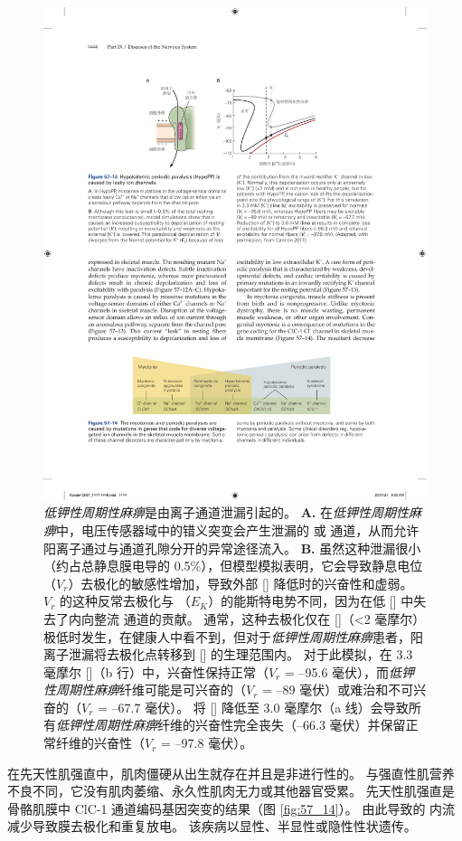 \begin{figure}[htbp]
	\centering
	\includegraphics[width=0.75\linewidth]{chap57/fig_57_13}
	\caption{\textit{低钾性周期性麻痹}是由离子通道泄漏引起的。
		\textbf{A.} 在\textit{低钾性周期性麻痹}中，电压传感器域中的错义突变会产生泄漏的  或  通道，从而允许阳离子通过与通道孔隙分开的异常途径流入。
		\textbf{B.} 虽然这种泄漏很小（约占总静息膜电导的 0.5\%），但模型模拟表明，它会导致静息电位（$V_r$）去极化的敏感性增加，导致外部 [] 降低时的兴奋性和虚弱。
		$V_r$ 的这种反常去极化与 （$E_K$）的能斯特电势不同，因为在低 [] 中失去了内向整流  通道的贡献。
		通常，这种去极化仅在 []（<2 毫摩尔）极低时发生，在健康人中看不到，但对于\textit{低钾性周期性麻痹}患者，阳离子泄漏将去极化点转移到 [] 的生理范围内。
		对于此模拟，在 3.3 毫摩尔 []（b 行）中，兴奋性保持正常（$V_r$ = –95.6 毫伏），而\textit{低钾性周期性麻痹}纤维可能是可兴奋的（$V_r$ = –89 毫伏）或难治和不可兴奋的（$V_r$ = –67.7 毫伏）。
		将 [] 降低至 3.0 毫摩尔（a 线）会导致所有\textit{低钾性周期性麻痹}纤维的兴奋性完全丧失（–66.3 毫伏）并保留正常纤维的兴奋性（$V_r$ = –97.8 毫伏）\cite{cannon2018sodium}。}
	\label{fig:57_13}
\end{figure}


在先天性肌强直中，肌肉僵硬从出生就存在并且是非进行性的。
与强直性肌营养不良不同，它没有肌肉萎缩、永久性肌肉无力或其他器官受累。
先天性肌强直是骨骼肌膜中 ClC-1  通道编码基因突变的结果（图 \ref{fig:57_14}）。
由此导致的  内流减少导致膜去极化和重复放电。
该疾病以显性、半显性或隐性性状遗传。


